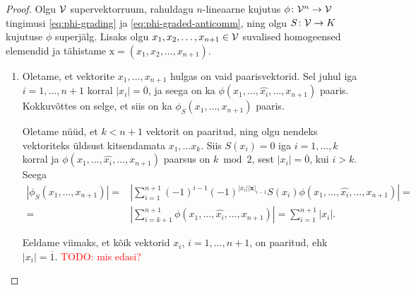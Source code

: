 \begin{proof}
    Olgu $\mathcal{V}$ supervektorruum, rahuldagu $n$-lineaarne
    kujutus $\phi \colon \mathcal{V}^n \to \mathcal{V}$ tingimusi
    \eqref{eq:phi-grading} ja \eqref{eq:phi-graded-anticomm}, ning
    olgu $S \colon \mathcal{V} \to K$ kujutuse $\phi$ superjälg. Lisaks olgu
    $x_1, x_2, \dots, x_{n+1} \in \mathcal{V}$ suvalised homogeensed elemendid
    ja tähistame $\mathrm{x} = (x_1, x_2, \dots, x_{n+1})$.
    \begin{enumerate}[label=\arabic*)]
        \item Oletame, et vektorite $x_1, \dots, x_{n+1}$ hulgas on vaid
            paarisvektorid. Sel juhul iga $i = 1, \dots, n+1$ korral
            $|x_i| = \overline{0}$, ja seega on ka
            $\phi(x_1, \dots, \hat{x_i}, \dots, x_{n+1})$ paaris. Kokkuvõttes
            on selge, et siis on ka $\phi_S(x_1, \dots, x_{n+1})$ paaris.

            Oletame nüüd, et $k < n + 1$ vektorit on paaritud, ning
            olgu nendeks vektoriteks üldsust kitsendamata $x_{1}, \dots x_{k}$.
            Siis $S(x_{i}) = 0$ iga $i = 1, \dots, k$ korral ja
            $\phi(x_1, \dots, \hat{x_i}, \dots, x_{n+1})$ paarsus on
            $k \bmod{2}$, sest $|x_i| = \overline{0}$, kui $i > k$.
            Seega
            \begin{align*}
                | \phi_S (x_1, \dots, x_{n+1}) | =&
                \left |
                    \sum_{i=1}^{n+1} (-1)^{i-1}(-1)^{
                        |x_i| |\mathbf{x}|_{i-1}
                    } S(x_i) \phi \left(
                        x_1, \dots, \hat{x_i}, \dots, x_{n+1}
                    \right)
                \right| = \\
                =& \left| \sum_{i=k+1}^{n+1}
                    \phi \left( x_1, \dots, \hat{x_i}, \dots, x_{n+1} \right)
                \right| = \sum_{i=1}^{n+1} |x_i|.
            \end{align*}

            Eeldame viimaks, et kõik vektorid $x_i$, $i = 1, \dots, n+1$,
            on paaritud, ehk $|x_i| = \overline{1}$. \textcolor{red}{TODO:
            mis edasi?}


\end{enumerate}
\end{proof}

